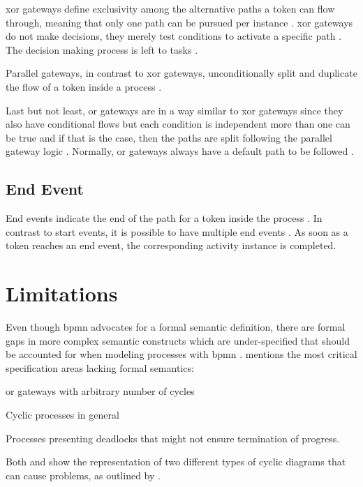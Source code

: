 \gls{xor} gateways define exclusivity among the alternative paths a token can flow through, meaning that only one path can be pursued per instance \citep{Silver2011}. \gls{xor} gateways do not make decisions, they merely test conditions to activate a specific path \citep{Silver2011}. The decision making process is left to tasks \citep{Silver2011}.

Parallel gateways, in contrast to \gls{xor} gateways, unconditionally split and duplicate the flow of a token inside a process \citep{Silver2011}.

Last but not least, \gls{or} gateways are in a way similar to \gls{xor} gateways since they also have conditional flows but each condition is independent \ie more than one can be true and if that is the case, then the paths are split following the parallel gateway logic \citep{Silver2011}. Normally, \gls{or} gateways always have a default path to be followed \citep{Silver2011}.

\subsection{End Event}

End events indicate the end of the path for a token inside the process \citep{Silver2011}. In contrast to start events, it is possible to have multiple end events \citep{Silver2011}. As soon as a token reaches an end event, the corresponding activity instance is completed.

\section{ Limitations}

Even though \gls{bpmn} advocates for a formal semantic definition, there are formal gaps in more complex semantic constructs which are under-specified that should be accounted for when modeling processes with \gls{bpmn} \citep{Soerensen2005}. \citet{Soerensen2005} mentions the most critical specification areas lacking formal semantics:
\begin{enumerate*}
	\item \gls{or} gateways with arbitrary number of cycles
	\item Cyclic processes in general
	\item Processes presenting deadlocks that might not ensure termination of progress.
\end{enumerate*}

Both  and  show the representation of two different types of cyclic diagrams that can cause problems, as outlined by \citet{Soerensen2005}.

